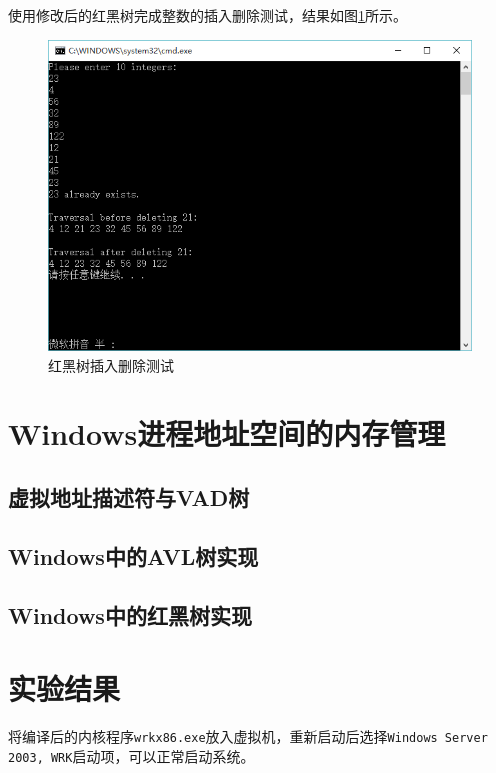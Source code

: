 \documentclass[a4paper, 11pt]{article}
\begin{document}
            使用修改后的红黑树完成整数的插入删除测试，结果如图\ref{fig:rbtreetest}所示。
            \begin{figure}[htb]
                \centering
                \includegraphics[width=15cm]{images/rbtreetest.png}
                \caption{红黑树插入删除测试}
                \label{fig:rbtreetest}
            \end{figure}
            
    \section{Windows进程地址空间的内存管理}
        \subsection{虚拟地址描述符与VAD树}
            
        \subsection{Windows中的AVL树实现}
            
        \subsection{Windows中的红黑树实现}
            
        
        
    \section{实验结果}
        将编译后的内核程序\texttt{wrkx86.exe}放入虚拟机，重新启动后选择\texttt{Windows Server 2003, WRK}启动项，可以正常启动系统。
        
\end{document}
